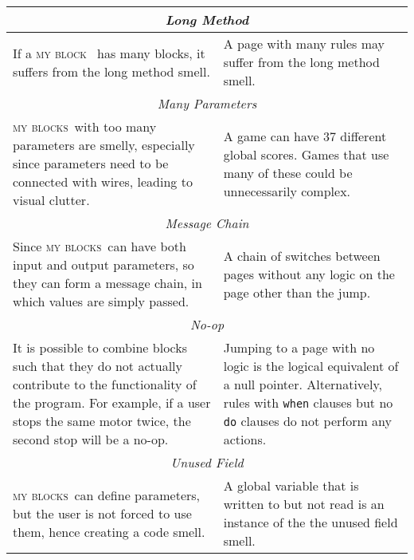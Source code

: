 \documentclass[conference]{IEEEtran}
\newcommand{\mbs}{\textsc{my blocks}}
\newcommand{\mb}{\textsc{my block}}
\begin{document}
\begin{table*}
\begin{tabular}{ p{3.38in}  p{3.37in} }
\multicolumn{2}{c}{ \emph{Long Method}} \\ \hline
 If a \mb~ has many blocks, it suffers from the long method smell. & A page with many rules may suffer from the long method smell. \\ \bottomrule
\multicolumn{2}{c}{ \emph{Many Parameters}} \\ \hline
 \mbs~with too many parameters are smelly, especially since parameters need to be connected with wires, leading to visual clutter. 
 & A game can have 37 different global scores. Games that use many of these could be unnecessarily complex.\\ \bottomrule
\multicolumn{2}{c}{ \emph{Message Chain}} \\ \hline
Since \mbs~can have both input and output parameters, so they can form a message chain, in which values are simply passed. 
& A chain of switches between pages without any logic on the page other than the jump. \\ \bottomrule
\multicolumn{2}{c}{ \emph{No-op}} \\ \hline 
 It is possible to combine blocks such that they do not actually contribute to the functionality of the program. For example, if a user stops the same motor twice, the second stop will be a no-op.
 & Jumping to a page with no logic is the logical equivalent of a null pointer. 
 Alternatively, rules with {\tt when} clauses but no {\tt do} clauses do not perform any actions.\\ \bottomrule
\multicolumn{2}{c}{ \emph{Unused Field}} \\ \hline
 \mbs~can define parameters, but the user is not forced to use them, hence creating a code smell.
 & A global variable that is written to but not read is an instance of the the unused field smell.\\ \bottomrule
\end{tabular}
\end{table*}
\end{document}

